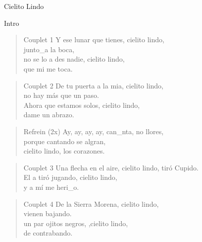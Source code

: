 \begin{song}[copla]{Cielito Lindo}
\begin{instrumental}{Intro}
\measure{}\measure{}\measure{}\measure{}\measure{}\measure{}
\measure{}\measure{}\measure{}\measure{}\measure{}\measure{}\measure{}
\measure{}\measure*{}
\end{instrumental}

\begin{verse}{Couplet 1}
Y ese lunar que tienes, cielito lindo,\\
junto\_a la boca,\hspace{5em}\\
\chord{}no se lo a des nadie, cielito lindo,\\
que mi me toca.\\
\end{verse}
\begin{verse}{Couplet 2}
De tu puerta a la mia, cielito lindo,\\
no hay más que un paso.\\
\chord{}Ahora que estamos solos, cielito lindo,\\
dame un abrazo.\\
\end{verse}
\begin{verse}{Refrein (2x)}
Ay, ay, ay, ay,\hspace{1em}\hspace{\wlskip} can\_nta, no llores,\\
porque cantando se algran,\\
cielito lindo, los corazones.\\
\end{verse}
\begin{verse}{Couplet 3}
Una flecha en el aire, cielito lindo,
tiró Cupido.\\
\chord{}El a tiró jugando, cielito lindo,\\
y a mí me heri\_o.\\
\end{verse}
\begin{verse}{Couplet 4}
De la Sierra Morena, cielito lindo,\\
vienen bajando.\\
\chord{}un par ojitos negros, ,cielito lindo,\\
de contrabando.\\
\end{verse}
\end{song}

